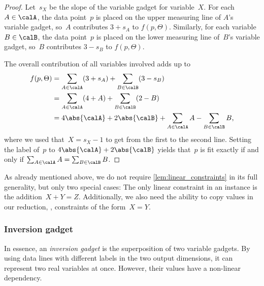 \begin{proof}
    Let~$s_X$ be the slope of the variable gadget for variable~$X$.
    For each~$A \in \calA$, the data point~$p$ is placed on the upper measuring line of $A$'s variable gadget, so~$A$ contributes $3 + s_A$ to $f(p, \Theta)$.
    Similarly, for each variable~$B \in \calB$, the data point~$p$ is placed on the lower measuring line of~$B$'s variable gadget, so~$B$ contributes $3 - s_B$ to $f(p, \Theta)$.

    The overall contribution of all %
variables involved  %
adds up to
    \begin{align*}
        f(p, \Theta)
        &= \sum_{A \in \calA} (3 + s_A) + \sum_{B \in \calB} (3 - s_B) \\
        &= \sum_{A \in \calA} (4 + A) + \sum_{B \in \calB} (2 - B) \\
        &= 4 \abs{\calA} + 2 \abs{\calB} + \sum_{A \in \calA} A - \sum_{B \in \calB} B
        \text{,}
    \end{align*}
    where we used that~$X = s_X - 1$ to get from the first to the second line.
    Setting the label of~$p$ to $4\abs{\calA} + 2\abs{\calB}$ yields that~$p$ is fit exactly if and only if $\sum_{A \in \calA} A = \sum_{B \in \calB} B$.
\end{proof}

As already mentioned above, we do not require \cref{lem:linear_constraints} in its full generality, but only two special cases:
The only linear constraint in an \ETRINV instance is the addition~$X + Y = Z$.
Additionally, we also need the ability to copy values in our reduction, \ie, constraints of the form~$X = Y$.


\subsubsection{Inversion gadget}

In essence, an \emph{inversion gadget} is the superposition of two variable gadgets.
By using data lines with different labels in the two output dimensions, it can represent two real variables at once.
However, their values have a non-linear dependency.

